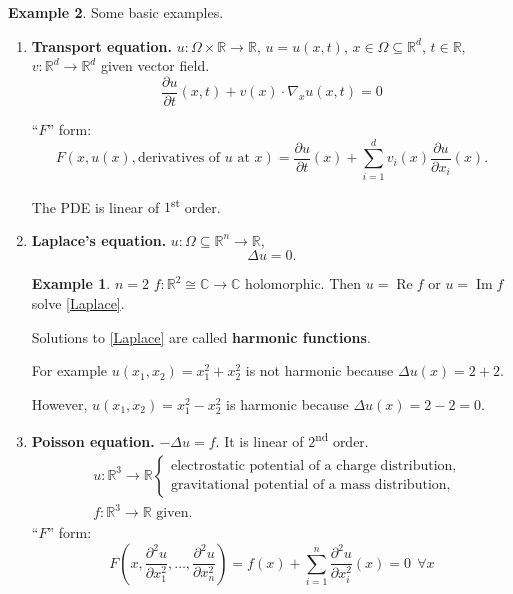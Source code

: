 \documentclass[12pt]{article}
\DeclareMathOperator{\Real}{Re}
\DeclareMathOperator{\Img}{Im}
\theoremstyle{definition}
\newtheorem*{example*}{Example}
\begin{document}
\begin{example*}
Some basic examples.

\begin{enumerate}[label=\alph*)]
\item \textbf{Transport equation.} $u:\Omega\times\mathbb{R}\rightarrow\mathbb{R}$, $u=u(x,t)$, $x\in\Omega\subseteq\mathbb{R}^d$, $t\in\mathbb{R}$, $v:\mathbb{R}^d\rightarrow\mathbb{R}^d$ given vector field.
\[\frac{\partial u}{\partial t}(x,t)+v(x)\cdot\nabla_xu(x,t)=0\]

``$F$'' form:
\[F(x,u(x),\text{derivatives of }u\text{ at }x)=\frac{\partial u}{\partial t}(x)+\sum_{i=1}^dv_i(x)\frac{\partial u}{\partial x_i}(x).\]

The PDE is linear of $1$\textsuperscript{st} order.

\item \textbf{Laplace's equation.} $u:\Omega\subseteq\mathbb{R}^n\rightarrow\mathbb{R}$,
\begin{equation}\tag{1}\label{Laplace}
\Delta u=0.
\end{equation}

\begin{example*}
$n=2$ $f:\mathbb{R}^2\cong\mathbb{C}\rightarrow\mathbb{C}$ holomorphic. Then $u=\Real f$ or $u=\Img f$ solve \eqref{Laplace}.
\end{example*}

Solutions to \eqref{Laplace} are called \textbf{harmonic functions}.

For example $u(x_1,x_2)=x_1^2+x_2^2$ is not harmonic because $\Delta u(x)=2+2$.

However, $u(x_1,x_2)=x_1^2-x_2^2$ is harmonic because $\Delta u(x)=2-2=0$.

\item \textbf{Poisson equation.} $-\Delta u=f$. It is linear of $2$\textsuperscript{nd} order.
\begin{align*}
&u:\mathbb{R}^3\longrightarrow\mathbb{R}\left\{\begin{array}{l}\text{electrostatic potential of a charge distribution},\\\text{gravitational potential of a mass distribution},\end{array}\right.\\
&f:\mathbb{R}^3\longrightarrow\mathbb{R}\text{ given}.
\end{align*}
``$F$'' form:
\[F\left(x,\frac{\partial^2u}{\partial x_1^2},\ldots,\frac{\partial^2u}{\partial x_n^2}\right)=f(x)+\sum_{i=1}^n\frac{\partial^2u}{\partial x_i^2}(x)=0\ \ \forall x\]


\end{enumerate}
\end{example*}
\end{document}
